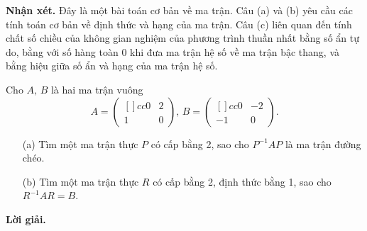 \textbf{Nhận xét. }Đây là một bài toán cơ bản về ma trận. Câu (a) và (b) yêu cầu các tính toán cơ bản về định thức và hạng của ma trận. Câu (c) liên quan đến tính chất số chiều của không gian nghiệm của phương trình thuần nhất bằng số ẩn tự do, bằng với số hàng toàn 0 khi đưa ma trận hệ số về ma trận bậc thang, và bằng hiệu giữa số ẩn và hạng của ma trận hệ số.

\begin{tcolorbox}[title=\textbf{Bài toán B.2.}]
    Cho $A,\,B$ là hai ma trận vuông $$A = \begin{pmatrix}[]{cc}
        0 & 2 \\
        1 & 0 
    \end{pmatrix},\,B = \begin{pmatrix}[]{cc}
        0 & -2 \\
        -1 & 0 
    \end{pmatrix}.$$

    \begin{enumerate}
        \item[(a)] Tìm một ma trận thực $P$ có cấp bằng 2, sao cho $P^{-1}AP$ là ma trận đường chéo.
        \item[(b)] Tìm một ma trận thực $R$ có cấp bằng 2, định thức bằng 1, sao cho $R^{-1}AR = B$.
    \end{enumerate}
\end{tcolorbox}

\textbf{Lời giải.}


